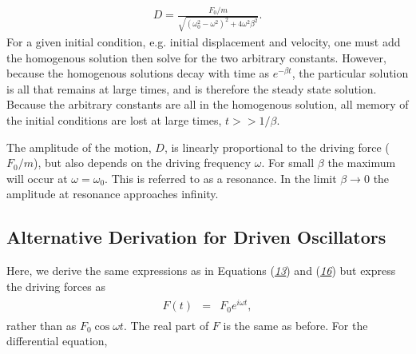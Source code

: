 \documentclass[letterpaper,10pt,english]{sphinxmanual}
\begin{document}
\begin{equation*}
\begin{split}
\begin{equation}
\label{eq:Ddrive} \tag{16}
D=\frac{F_0/m}{\sqrt{(\omega_0^2-\omega^2)^2+4\omega^2\beta^2}}.
\end{equation}
\end{split}
\end{equation*}
For a given initial condition, e.g. initial displacement and velocity,
one must add the homogenous solution then solve for the two arbitrary
constants. However, because the homogenous solutions decay with time
as \(e^{-\beta t}\), the particular solution is all that remains at
large times, and is therefore the steady state solution. Because the
arbitrary constants are all in the homogenous solution, all memory of
the initial conditions are lost at large times, \(t>>1/\beta\).

The amplitude of the motion, \(D\), is linearly proportional to the
driving force (\(F_0/m\)), but also depends on the driving frequency
\(\omega\). For small \(\beta\) the maximum will occur at
\(\omega=\omega_0\). This is referred to as a resonance. In the limit
\(\beta\rightarrow 0\) the amplitude at resonance approaches infinity.


\subsection{Alternative Derivation for Driven Oscillators}
\label{\detokenize{chapter4:alternative-derivation-for-driven-oscillators}}
Here, we derive the same expressions as in Equations ({\hyperref[\detokenize{chapter4:eq:partform}]{\emph{13}}}) and ({\hyperref[\detokenize{chapter4:eq:Ddrive}]{\emph{16}}}) but express the driving forces as
\begin{equation*}
\begin{split}
\begin{eqnarray}
F(t)&=&F_0e^{i\omega t},
\end{eqnarray}
\end{split}
\end{equation*}
rather than as \(F_0\cos\omega t\). The real part of \(F\) is the same as before. For the differential equation,
\end{document}
